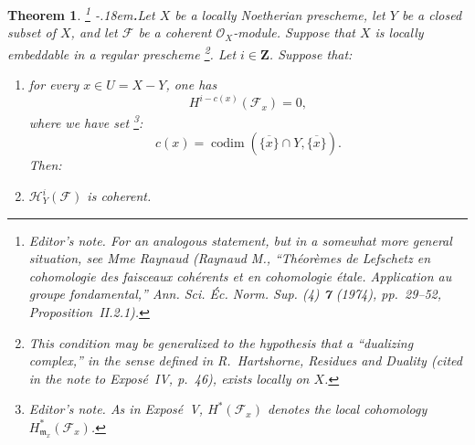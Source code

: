 \documentclass[11pt,a4paper,oneside]{book}
\providecommand{\markedfootnote}[2]{%
  \begingroup\renewcommand{\thefootnote}{#1}\footnote{#2}\endgroup}
\providecommand{\ZZ}{\mathbf Z}
\providecommand{\cF}{\mathcal F}
\providecommand{\OX}{\mathcal O_X}
\theoremstyle{plain}
\newtheorem{theorem}[subsection]{Theorem}
\theoremstyle{definition}
\theoremstyle{remark}
\begin{document}
\begin{theorem}\label{VIII.2.1}
\markedfootnote{(1)}{\textit{Editor's note.} For an analogous statement, but
in a somewhat more general situation, see Mme Raynaud (Raynaud M., ``Th\'eor\`emes de
Lefschetz en cohomologie des faisceaux coh\'erents et en cohomologie
\'etale. Application au groupe fondamental,'' \emph{Ann. Sci. \'Ec. Norm.
Sup.} (4) \textbf{7} (1974), pp.~29--52, Proposition~II.2.1).}%
\kern-.18em\textbf{.}\enspace Let $X$ be a locally Noetherian prescheme, let $Y$ be a closed subset of $X$,
and let $\cF$ be a coherent $\OX$-module. Suppose that $X$ is locally
embeddable in a regular prescheme\markedfootnote{*}{This condition may be
generalized to the hypothesis that a ``dualizing complex,'' in the sense
defined in R.~Hartshorne, \emph{Residues and Duality} (cited in the note to
Expos\'e~IV, p.~46), exists locally on $X$.}. Let $i\in\ZZ$. Suppose that:
\begin{enumerate}[label=\textup{\alph*)},leftmargin=2.2em,itemsep=0.5\baselineskip]
\item for every $x\in U=X-Y$, one has
\begin{equation*}
  H^{i-c(x)}(\cF_x)=0,
\end{equation*}
where we have set\markedfootnote{(2)}{\textit{Editor's note.} As in
Expos\'e~V, $H^{\ast}(\cF_x)$ denotes the local cohomology
$H^{\ast}_{\mathfrak m_x}(\cF_x)$.}:
\begin{equation}\label{eq:VIII.2.1}
  c(x)=\operatorname{codim}
  (\overline{\{x\}}\cap Y,\overline{\{x\}}).
\end{equation}
Then:
\item $\mathcal H^i_Y(\cF)$ is coherent.
\end{enumerate}
\end{theorem}

\end{document}
